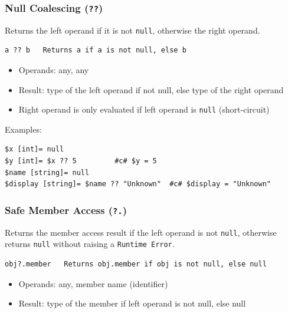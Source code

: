 \subsubsection{Null Coalescing (\texttt{??})}
Returns the left operand if it is not \texttt{null}, otherwise the right operand.
\begin{verbatim}
a ?? b   Returns a if a is not null, else b
\end{verbatim}
\begin{itemize}
\item Operands: any, any
\item Result: type of the left operand if not null, else type of the right operand
\item Right operand is only evaluated if left operand is \texttt{null} (short-circuit)
\end{itemize}

Examples:
\begin{verbatim}
$x [int]= null
$y [int]= $x ?? 5         #c# $y = 5
$name [string]= null
$display [string]= $name ?? "Unknown"  #c# $display = "Unknown"
\end{verbatim}

\subsubsection{Safe Member Access (\texttt{?.})}
Returns the member access result if the left operand is not \texttt{null}, otherwise returns \texttt{null} without raising a \texttt{Runtime Error}.
\begin{verbatim}
obj?.member   Returns obj.member if obj is not null, else null
\end{verbatim}
\begin{itemize}
\item Operands: any, member name (identifier)
\item Result: type of the member if left operand is not null, else null
\end{itemize}

